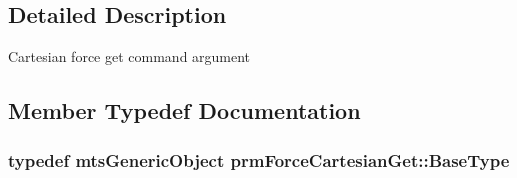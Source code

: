\subsection{Detailed Description}
Cartesian force get command argument 

\subsection{Member Typedef Documentation}
\hypertarget{classprm_force_cartesian_get_ac1f56480b9858aece8a2cc7bb2b87e6c}{
\subsubsection[{Base\-Type}]{\setlength{\rightskip}{0pt plus 5cm}typedef {\bf mts\-Generic\-Object} {\bf prm\-Force\-Cartesian\-Get\-::\-Base\-Type}}}\label{classprm_force_cartesian_get_ac1f56480b9858aece8a2cc7bb2b87e6c}


